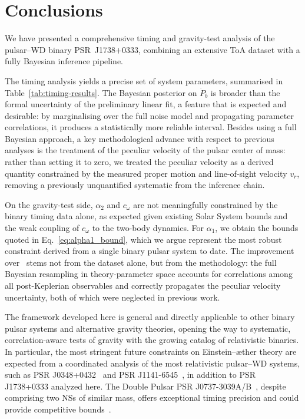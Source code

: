 \documentclass[
    floats,
    floatfix,
    amssymb,
    prd,
    twocolumn,
    superscriptaddress,
    nofootinbib,
    unicode,
    colorlinks=true,
    linktocpage=true
]{revtex4-2}
\begin{document}
\section{Conclusions}
\label{sec:conclusions}

We have presented a comprehensive timing and gravity-test analysis of the 
pulsar--WD binary PSR~J1738$+$0333, combining an extensive ToA 
dataset with a fully Bayesian inference pipeline.

The timing analysis yields a precise set of system parameters, 
summarised in Table~\ref{tab:timing-results}. The Bayesian posterior on 
$\dot{P}_b$ is broader than the formal uncertainty of the preliminary 
linear fit, a feature that is expected and desirable: by marginalising 
over the full noise model and propagating parameter correlations, it 
produces a statistically more reliable interval. Besides using a full Bayesian approach, a key methodological 
advance with respect to previous analyses is the treatment of the 
peculiar velocity of the pulsar center of mass: rather than setting it to zero, 
we treated the peculiar velocity as a derived quantity constrained by the 
measured proper motion and line-of-sight velocity $v_r$, removing a 
previously unquantified systematic from the inference chain.

On the gravity-test side, $\alpha_2$ and $c_\omega$ are not 
meaningfully constrained by the binary timing data alone, as expected 
given existing Solar System bounds and the weak coupling of $c_\omega$ 
to the two-body dynamics. For $\alpha_1$, we obtain the bounds 
quoted in Eq.~\eqref{eq:alpha1_bound}, which we argue represent the most 
robust constraint derived from a single binary pulsar system to date. 
The improvement over~\citet{Gupta_2021} stems not from the dataset alone, 
but from the methodology: the full Bayesian resampling in theory-parameter 
space accounts for correlations among all post-Keplerian observables and 
correctly propagates the peculiar velocity uncertainty, both of which 
were neglected in previous work.

The framework developed here is general and directly applicable to other binary pulsar systems and alternative gravity theories, opening the way to systematic, correlation-aware tests of gravity with the growing catalog of relativistic binaries. In particular, the most stringent future constraints on Einstein--\ae ther theory are expected from a coordinated analysis of the most relativistic pulsar--WD systems, such as PSR J0348+0432~\cite{Lynch+J0348-2013} and PSR J1141-6545~\cite{Kaspi+J1141-2000}, in addition to PSR J1738+0333 analyzed here. The Double Pulsar PSR J0737-3039A/B~\cite{Burgay+J0737-2003,Lyne+J0737-2004}, despite comprising two NSs of similar mass, offers exceptional timing precision and could provide competitive bounds~\cite{Kramer+J0737-2021}.
\end{document}
